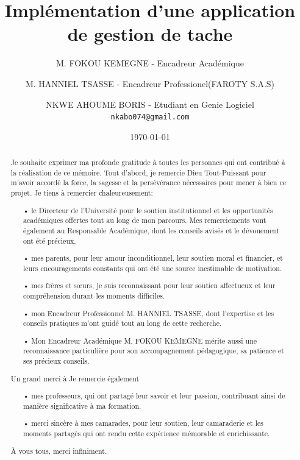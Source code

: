 \documentclass[a4paper,12pt]{report}
\title{Implémentation d'une application de gestion de tache}
\author{
  M. FOKOU KEMEGNE - Encadreur Académique\\
  \and
  M. HANNIEL TSASSE - Encadreur Professionel(FAROTY S.A.S)\\
  \and
  NKWE AHOUME BORIS - Etudiant en Genie Logiciel\\
  \texttt{nkabo074@gmail.com}
}
\date{\today}
\begin{document}
\vspace{0.06cm}

\maketitle

\tableofcontents

\def\chaptername{Chapitre} 

\renewcommand{\abstractname}{Remerciment}
\begin{abstract}
Je souhaite exprimer ma profonde gratitude à toutes les personnes qui ont contribué à la réalisation de ce mémoire. Tout d'abord, je remercie Dieu Tout-Puissant pour m'avoir accordé la force, la sagesse et la persévérance nécessaires pour mener à bien ce projet.
Je tiens à remercier chaleureusement:

\begin{itemize}
  \item[•] le Directeur de l'Université pour le soutien institutionnel et les opportunités académiques offertes tout au long de mon parcours. Mes remerciements vont également au Responsable Académique, dont les conseils avisés et le dévouement ont été précieux.
  \item[•] mes parents, pour leur amour inconditionnel, leur soutien moral et financier, et leurs encouragements constants qui ont été une source inestimable de motivation.
  \item[•] mes frères et sœurs, je suis reconnaissant pour leur soutien affectueux et leur compréhension durant les moments difficiles.
  \item[•] mon Encadreur Professionnel M. HANNIEL TSASSE, dont l'expertise et les conseils pratiques m'ont guidé tout au long de cette recherche. 
  \item[•]Mon Encadreur Académique M. FOKOU KEMEGNE mérite aussi une reconnaissance particulière pour son accompagnement pédagogique, sa patience et ses précieux conseils.
\end{itemize}

Un grand merci à 
Je remercie également

\begin{itemize}
  \item[•] mes professeurs, qui ont partagé leur savoir et leur passion, contribuant ainsi de manière significative à ma formation.
  \item[•] merci sincère à mes camarades, pour leur soutien, leur camaraderie et les moments partagés qui ont rendu cette expérience mémorable et enrichissante.
\end{itemize}

À vous tous, merci infiniment.
\end{abstract}
\end{document}
